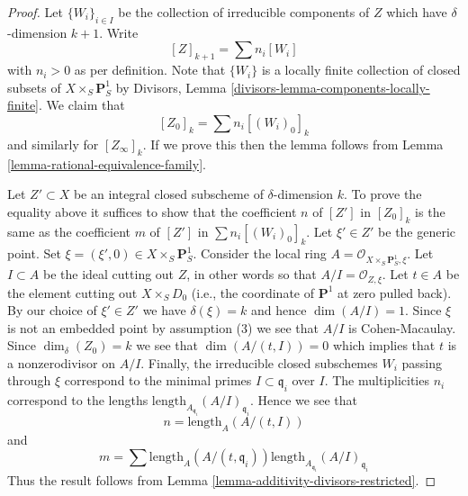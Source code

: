 \documentclass[10pt,a4paper]{amsart}
\theoremstyle{plain}
\theoremstyle{definition}
\theoremstyle{remark}
\numberwithin{equation}{subsection}
\begin{document}
\begin{proof}
Let $\{W_i\}_{i \in I}$ be the collection of irreducible
components of $Z$ which have $\delta$-dimension $k + 1$.
Write
$$
[Z]_{k + 1} = \sum n_i[W_i]
$$
with $n_i > 0$ as per definition. Note that $\{W_i\}$
is a locally finite collection of closed subsets of
$X \times_S \mathbf{P}^1_S$ by
Divisors, Lemma \ref{divisors-lemma-components-locally-finite}.
We claim that
$$
[Z_0]_k = \sum n_i[(W_i)_0]_k
$$
and similarly for $[Z_\infty]_k$. If we prove this then the lemma
follows from Lemma \ref{lemma-rational-equivalence-family}.

\medskip\noindent
Let $Z' \subset X$ be an integral closed subscheme of $\delta$-dimension $k$.
To prove the equality above it suffices to show that the coefficient $n$
of $[Z']$ in $[Z_0]_k$ is the same as the coefficient $m$ of
$[Z']$ in $\sum n_i[(W_i)_0]_k$. Let $\xi' \in Z'$ be the generic point.
Set $\xi = (\xi', 0) \in  X \times_S \mathbf{P}^1_S$.
Consider the local ring $A = \mathcal{O}_{X \times_S \mathbf{P}^1_S, \xi}$.
Let $I \subset A$ be the ideal cutting out $Z$, in other words so that
$A/I = \mathcal{O}_{Z, \xi}$. Let $t \in A$ be the element cutting
out $X \times_S D_0$ (i.e., the coordinate of $\mathbf{P}^1$ at zero
pulled back). By our choice of $\xi' \in Z'$ we have $\delta(\xi) = k$
and hence $\dim(A/I) = 1$. Since $\xi$ is not an embedded point by
assumption (3) we see that $A/I$ is Cohen-Macaulay. Since $\dim_\delta(Z_0)
= k$ we see that $\dim(A/(t, I)) = 0$ which implies that $t$
is a nonzerodivisor on $A/I$. Finally, the irreducible closed subschemes
$W_i$ passing through $\xi$ correspond to the minimal primes
$I \subset \mathfrak q_i$ over $I$. The multiplicities $n_i$ correspond
to the lengths $\text{length}_{A_{\mathfrak q_i}}(A/I)_{\mathfrak q_i}$.
Hence we see that
$$
n = \text{length}_A(A/(t, I))
$$
and
$$
m = \sum
\text{length}_A(A/(t, \mathfrak q_i))
\text{length}_{A_{\mathfrak q_i}}(A/I)_{\mathfrak q_i}
$$
Thus the result follows from
Lemma \ref{lemma-additivity-divisors-restricted}.
\end{proof}
\end{document}
